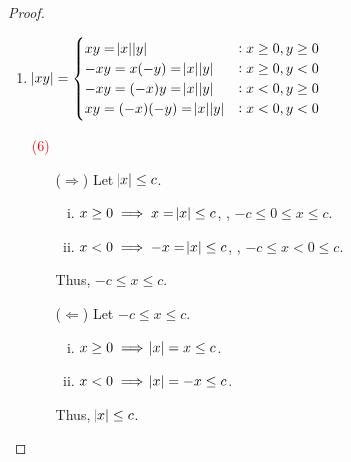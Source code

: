 \documentclass[11pt,openany]{article}
\begin{document}
\begin{proof}
\begin{enumerate}[(1)]
\begin{center}
	\end{center}
	\item $\abs{xy}=\begin{cases}
		xy=\abs{x}\abs{y} &:x\geq0,y\geq 0\\
		-xy=x(-y)=\abs{x}\abs{y} &:x\geq0,y< 0\\
		-xy=(-x)y=\abs{x}\abs{y} &:x<0,y\geq 0\\
		xy=(-x)(-y)=\abs{x}\abs{y} &:x<0,y< 0
	\end{cases}$
%			
%			
	\vspace{1cm}
	\item[\textcolor{red}{(6)}] 
	\begin{itemize}
		\item[($\Rightarrow$)] Let $\abs{x}\leq c$. \begin{enumerate}[(i)]
			\item $x\geq 0\implies x=\abs{x}\leq c$, \ie, $-c\leq 0\leq x\leq c$.
			\item $x<0\implies -x=\abs{x}\leq c$, \ie, $-c\leq x< 0\leq c$.
		\end{enumerate} Thus, $-c\leq x\leq c$.
		\vspace{.5cm}
		\item[($\Leftarrow$)] Let $-c\leq x\leq c$. \begin{enumerate}[(i)]
			\item $x\geq 0\implies \abs{x}=x\leq c$.
			\item $x<0\implies \abs{x}=-x\leq c$.
		\end{enumerate} Thus, $\abs{x}\leq c$.
	\end{itemize}
	\begin{center}
	\begin{tikzpicture}[scale=1.5, >=stealth]
		

\end{tikzpicture}
\end{center}
\end{enumerate}
\end{proof}
\end{document}
